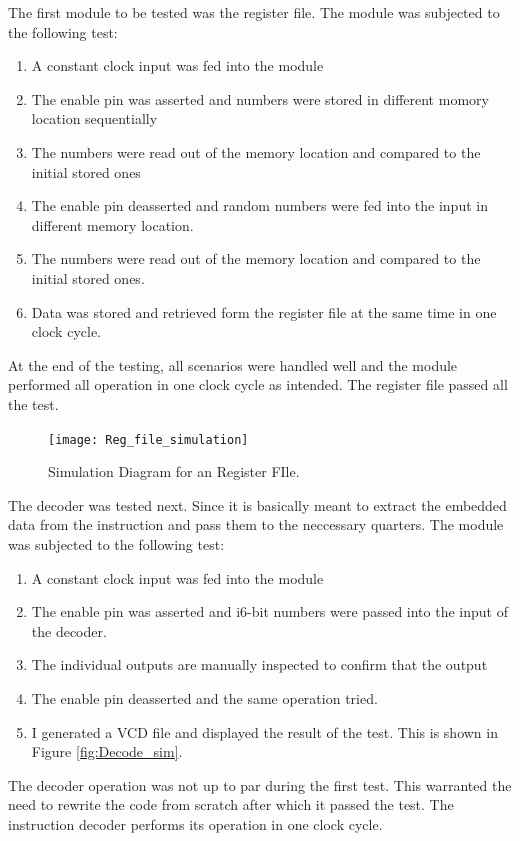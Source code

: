 The first module to be tested was the register file. The module was subjected to the following test:
\begin{enumerate}
\item A constant clock input was fed into the module
\item The enable pin was asserted and numbers were stored in different momory location sequentially
\item The numbers were read out of the memory location and compared to the initial stored ones
\item The enable pin deasserted and random numbers were fed into the input in different memory location.
\item The numbers were read out of the memory location and compared to the initial stored ones.
\item Data was stored and retrieved form the register file at the same time in one clock cycle.

\end{enumerate}
At the end of the testing, all scenarios were handled well and the module performed all operation in one clock cycle as intended. The register file passed all the test.


\begin{figure}
    \centering
    \texttt{[image: Reg\_file\_simulation]}
	\caption{Simulation Diagram for an Register FIle.}
    \label{fig:reg_sim}
\end{figure}

The decoder was tested next. Since it is basically meant to extract the embedded data from the instruction and pass them to the neccessary quarters. The module was subjected to the following test:
\begin{enumerate}
\item A constant clock input was fed into the module
\item The enable pin was asserted and i6-bit numbers were passed into the input of the decoder.
\item The individual outputs are manually inspected to confirm that the output  
\item The enable pin deasserted and the same operation tried.
\item I generated a VCD file and displayed the result of the test. This is shown in Figure \ref{fig:Decode_sim}.
\end{enumerate}
The decoder operation was not up to par during the first test. This warranted the need to rewrite the code from scratch after which it passed the test. The instruction decoder performs its operation in one clock cycle.

